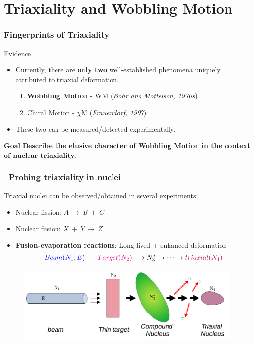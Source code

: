 \documentclass{beamer}
\begin{document}
\section{Triaxiality and Wobbling Motion}

\begin{frame}
	\frametitle{Fingerprints of Triaxiality}
	\begin{block}{Evidence \faSearch}
		\begin{itemize}
			\item Currently, there are \textbf{only two} well-established phenomena uniquely attributed to triaxial deformation.
			\begin{enumerate}
				\item \textbf{Wobbling Motion} - WM (\emph{Bohr and Mottelson, 1970s})
				\item Chiral Motion - $\chi$M (\emph{Frauendorf, 1997})
			\end{enumerate}
			\item These two can be measured/detected experimentally.
		\end{itemize}
	\end{block}
	\begin{exampleblock}{\textbf{Goal} \faClipboard}
		\textbf{Describe the elusive character of Wobbling Motion in the context of nuclear triaxiality.}
	\end{exampleblock}
\end{frame}

\begin{frame}
	\frametitle{\faSearch\ Probing triaxiality in nuclei}
    Triaxial nuclei can be observed/obtained in several experiments:
    \begin{itemize}
        \item Nuclear fission: $A\ \rightarrow\ B\ +\ C$
        \item Nuclear fusion: $X\ +\ Y\ \rightarrow\ Z$
        \item \textbf{Fusion-evaporation reactions}: {\color{red}Long-lived} + {\color{red}enhanced deformation}
        \vspace{-0.3cm}
        \begin{align}
            {\color{blue}Beam(N_1,E)}\ +\ {\color{magenta}Target(N_2)}\longrightarrow N_3^*\rightarrow\dots\rightarrow {\color{purple}triaxial(N_4)} \nonumber
        \end{align}
    \end{itemize}
	\vspace{-0.3cm}
    \begin{figure}
        \centering
        \includegraphics[width=0.99\textwidth]{figures/fusion-evaporation.pdf}
    \end{figure}
\end{frame}
\end{document}

